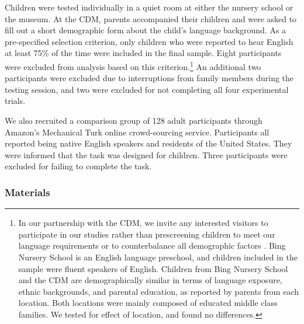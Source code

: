 \documentclass[man]{apa2}
\begin{document}
Children were tested individually in a quiet room at either the nursery school or the museum. At the CDM, parents accompanied their children and were asked to fill out a short demographic form about the child's language background. As a pre-specified selection criterion, only children who were reported to hear English at least 75\% of the time were included in the final sample.  Eight participants were excluded from analysis based on this criterion.\footnote{In our partnership with the CDM, we invite any interested visitors to participate in our studies rather than prescreening children to meet our language requirements or to counterbalance all demographic factors \cite{callanan2012}. Bing Nursery School is an English language preschool, and children included in the sample were fluent speakers of English. Children from Bing Nursery School and the CDM are demographically similar in terms of language exposure, ethnic backgrounds, and parental education, as reported by parents from each location.  Both locations were mainly composed of educated middle class families.  We tested for effect of location, and found no differences.}  An additional two participants were excluded due to interruptions from family members during the testing session, and two were excluded for not completing all four experimental trials. 

We also recruited a comparison group of 128 adult participants through Amazon's Mechanical Turk online crowd-sourcing service.  Participants all reported being native English speakers and residents of the United States. They were informed that the task was designed for children. Three participants were excluded for failing to complete the task.  

\subsubsection{Materials}
\end{document}
